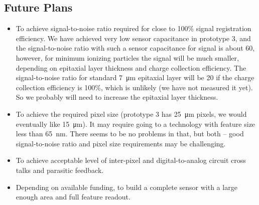 \subsection{Future Plans}
\begin{itemize}
    \item To achieve signal-to-noise ratio required for close to 100\% signal registration efficiency. We have achieved very low sensor capacitance in prototype 3, and the signal-to-noise ratio with such a sensor capacitance for  signal is about 60, however, for minimum ionizing particles the signal will be much smaller, depending on epitaxial layer thickness and charge collection efficiency. The signal-to-noise ratio for standard \SI{7}{\micro\meter} epitaxial layer will be 20 if the charge collection efficiency is 100\%, which is unlikely (we have not measured it yet). So we probably will need to increase the epitaxial layer thickness.
    \item To achieve the required pixel size (prototype 3 has \SI{25}{\micro\meter} pixels, we would eventually like \SI{15}{\micro\meter}). It may require going to a technology with feature size less than \SI{65}{nm}. There seems to be no problems in that, but both -- good signal-to-noise ratio and pixel size requirements may be challenging.
    \item To achieve acceptable level of inter-pixel and digital-to-analog circuit cross talks and parasitic feedback.
    \item Depending on available funding, to build a complete sensor with a large enough area and full feature readout.
\end{itemize}
